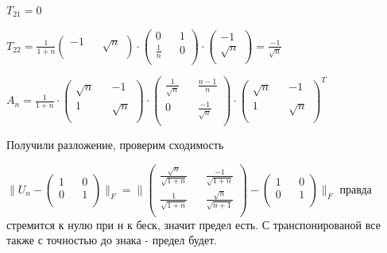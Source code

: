 \documentclass[a4paper, 11pt]{article}
\begin{document}
\begin{enumerate}
\begin{enumerate}
			$T_{21} = 0$
			
			$T_{22} = \frac{1}{1 + n} \begin{pmatrix}
				-1 && \sqrt{n} \\ 
			\end{pmatrix} \cdot \begin{pmatrix}
				0 && 1 \\
				\frac{1}{n} && 0 \\
			\end{pmatrix} \cdot \begin{pmatrix}
				-1 \\
				\sqrt{n} \\
			\end{pmatrix} = \frac{-1}{\sqrt{n}}$
		
		
		$A_n = \frac{1}{1 + n} \cdot \begin{pmatrix}
			\sqrt{n} && -1 \\
			1 && \sqrt{n} \\
		\end{pmatrix} \cdot \begin{pmatrix}
			\frac{1}{\sqrt{n}} && \frac{n - 1}{n} \\
			0 && \frac{-1}{\sqrt{n}} \\ 
	\end{pmatrix} \cdot \begin{pmatrix}
			\sqrt{n} && -1 \\
			1 && \sqrt{n} \\
		\end{pmatrix}^T$
	
	Получили разложение, проверим сходимость
	
			$\|U_n - \begin{pmatrix}
				1 && 0 \\
				0 && 1 \\
			\end{pmatrix}\|_F = \| \begin{pmatrix}
		\frac{\sqrt{n}}{\sqrt{1 + n}} && \frac{-1}{\sqrt{1 + n}} \\
		\frac{1}{\sqrt{1 + n}} && \frac{\sqrt{n}}{\sqrt{n + 1}} \\
	\end{pmatrix} - \begin{pmatrix}
			1 && 0 \\
			0 && 1 \\
		\end{pmatrix}\|_F$ правда стремится к нулю при н к беск, значит предел есть. С транспонированой все также с точностью до знака - предел будет.
	

\end{enumerate}
\end{enumerate}
\end{document}
